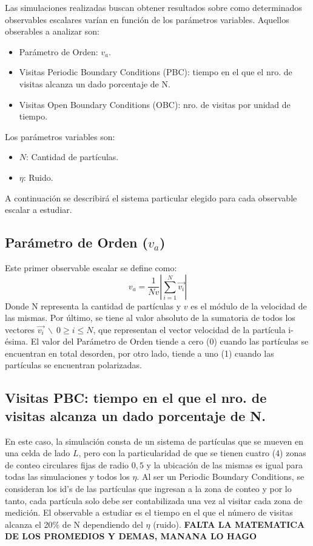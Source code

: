 \documentclass[11pt]{article}
\begin{document}
        Las simulaciones realizadas buscan obtener resultados sobre como determinados observables escalares varían
        en función de los parámetros variables. Aquellos obserables a analizar son:
        \begin{itemize}
            \item Parámetro de Orden: $v_a$.
            \item Visitas Periodic Boundary Conditions (PBC): tiempo en el que el nro. de visitas alcanza un dado porcentaje de N.
            \item Visitas Open Boundary Conditions (OBC): nro. de visitas por unidad de tiempo.
        \end{itemize}
        Los parámetros variables son:
        \begin{itemize}
            \item $N$: Cantidad de partículas.
            \item $\eta$: Ruido.
        \end{itemize}

        A continuación se describirá el sistema particular elegido para cada observable escalar a estudiar.

        \subsection{Parámetro de Orden ($v_a$)}
            Este primer observable escalar se define como:
            \begin{equation}
                v_a = \frac{1}{Nv} \left|\sum_{i=1}^{N} \vec{v_i} \right|
            \end{equation}
            Donde N representa la cantidad de partículas y $v$ es el módulo de la velocidad de las mismas. Por último,
            se tiene al valor absoluto de la sumatoria de todos los vectores $\vec{v_i} \  \backslash \  0 \geq i \leq N$,
            que representan el vector velocidad de la partícula i-ésima. El valor del Parámetro de Orden tiende a cero
            (0) cuando las partículas se encuentran en total desorden, por otro lado, tiende a uno (1) cuando las partículas
            se encuentran polarizadas.

        \subsection{Visitas PBC: tiempo en el que el nro. de visitas alcanza un dado porcentaje de N.}
            En este caso, la simulación consta de un sistema de partículas que se mueven en una celda de lado $L$,
            pero con la particularidad de que se tienen cuatro (4) zonas de conteo circulares fijas de radio $0,5$ y la
            ubicación de las mismas es igual para todas las simulaciones y todos los $\eta$.
            Al ser un Periodic Boundary Conditions, se consideran los id's de las partículas que ingresan a la zona de
            conteo y por lo tanto, cada partícula solo debe ser contabilizada una vez al visitar cada zona de medición.
            El observable a estudiar es el tiempo en el que el número de visitas alcanza el 20\% de N dependiendo
            del $\eta$ (ruido).
            \textbf{FALTA LA MATEMATICA DE LOS PROMEDIOS Y DEMAS, MANANA LO HAGO}
\end{document}
